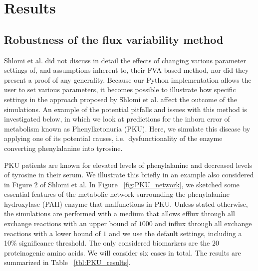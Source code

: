 \documentclass[10pt,a4paper,onecolumn]{article}
\begin{document}
\section{Results}\label{results}

\subsection{Robustness of the flux variability
method}\label{robustness-of-the-flux-variability-method}

Shlomi et al. did not discuss in detail the effects of changing various
parameter settings of, and assumptions inherent to, their FVA-based
method, nor did they present a proof of any generality. Because our
Python implementation allows the user to set various parameters, it
becomes possible to illustrate how specific settings in the approach
proposed by Shlomi et al. affect the outcome of the simulations. An
example of the potential pitfalls and issues with this method is
investigated below, in which we look at predictions for the inborn error
of metabolism known as Phenylketonuria (PKU). Here, we simulate this
disease by applying one of its potential causes, i.e.~dysfunctionality
of the enzyme converting phenylalanine into tyrosine.

PKU patients are known for elevated levels of phenylalanine and
decreased levels of tyrosine in their serum. We illustrate this briefly
in an example also considered in Figure 2 of Shlomi et al. In Figure
~\ref{fig:PKU_network}, we sketched some essential features of the
metabolic network surrounding the phenylalanine hydroxylase (PAH) enzyme
that malfunctions in PKU. Unless stated otherwise, the simulations are
performed with a medium that allows efflux through all exchange
reactions with an upper bound of \(1000\) and influx through all
exchange reactions with a lower bound of \(1\) and we use the default
settings, including a 10\% significance threshold. The only considered
biomarkers are the \(20\) proteinogenic amino acids. We will consider
six cases in total. The results are summarized in Table
~\ref{tbl:PKU_results}.
\end{document}
